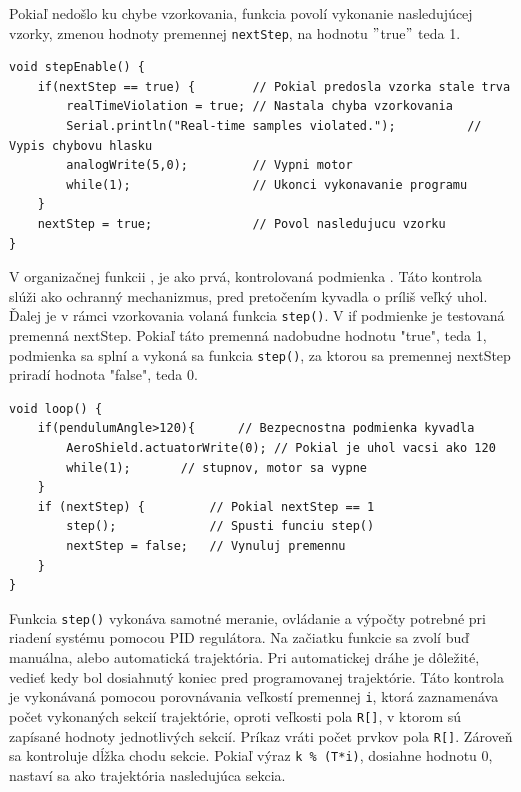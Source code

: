 Pokiaľ nedošlo ku chybe vzorkovania, funkcia povolí vykonanie nasledujúcej vzorky, zmenou hodnoty premennej \verb|nextStep|, na hodnotu $"$true$"$ teda 1. 

\begin{lstlisting}[caption={Funkcia stepEnable().},captionpos=b]
void stepEnable() {                          
	if(nextStep == true) {        // Pokial predosla vzorka stale trva
		realTimeViolation = true; // Nastala chyba vzorkovania
		Serial.println("Real-time samples violated."); 			// Vypis chybovu hlasku
		analogWrite(5,0);         // Vypni motor 
		while(1);                 // Ukonci vykonavanie programu
	}
	nextStep = true;              // Povol nasledujucu vzorku
}
\end{lstlisting}

V organizačnej funkcii , je ako prvá, kontrolovaná podmienka . Táto kontrola slúži ako ochranný mechanizmus, pred pretočením kyvadla o príliš veľký uhol. Ďalej je v rámci vzorkovania volaná funkcia \verb|step()|. V if podmienke je testovaná premenná nextStep. Pokiaľ táto premenná nadobudne hodnotu "true", teda 1, podmienka sa splní a vykoná sa funkcia \verb|step()|, za ktorou sa premennej nextStep priradí hodnota "false", teda 0.

\begin{lstlisting}[caption={Organzačná funkcia loop.},captionpos=b]
void loop() {
	if(pendulumAngle>120){		// Bezpecnostna podmienka kyvadla 
		AeroShield.actuatorWrite(0); // Pokial je uhol vacsi ako 120
		while(1);		// stupnov, motor sa vypne
	} 
	if (nextStep) {         // Pokial nextStep == 1
		step();             // Spusti funciu step()
		nextStep = false;   // Vynuluj premennu 
	}
}
\end{lstlisting}

Funkcia \verb|step()| vykonáva samotné meranie, ovládanie a výpočty potrebné pri riadení systému pomocou PID regulátora. Na začiatku funkcie sa zvolí buď manuálna, alebo automatická trajektória. Pri automatickej dráhe je dôležité, vedieť kedy bol dosiahnutý koniec pred programovanej trajektórie. Táto kontrola je vykonávaná pomocou porovnávania veľkostí premennej \verb|i|, ktorá zaznamenáva počet vykonaných sekcií trajektórie, oproti veľkosti pola \verb|R[]|, v ktorom sú zapísané hodnoty jednotlivých sekcií. Príkaz  vráti počet prvkov pola \verb|R[]|. Zároveň sa kontroluje dĺžka chodu sekcie. Pokiaľ výraz \verb|k % (T*i)|, dosiahne hodnotu 0, nastaví sa ako trajektória nasledujúca sekcia. 

